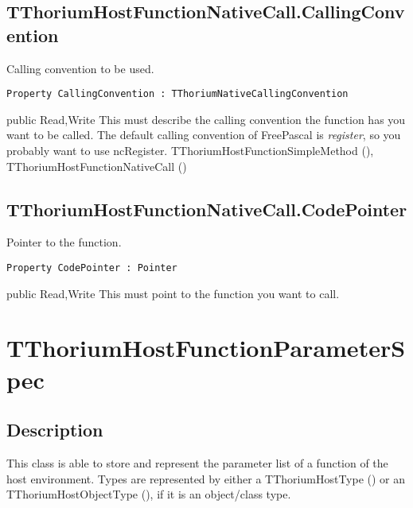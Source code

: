 \subsection{TThoriumHostFunctionNativeCall.CallingConvention}
\label{thoriumcorepkg:thorium:tthoriumhostfunctionnativecall:callingconvention}
\begin{FPCList}
\Synopsis
Calling convention to be used.\Declaration 

\begin{verbatim}
Property CallingConvention : TThoriumNativeCallingConvention
\end{verbatim}
\Visibility
public
\Access
Read,Write
\Description
This must describe the calling convention the function has you want to be called. The default calling convention of FreePascal is \textit{register}, so you probably want to use ncRegister.\SeeAlso
TThoriumHostFunctionSimpleMethod (\pageref{thoriumcorepkg:thorium:tthoriumhostfunctionsimplemethod}),
TThoriumHostFunctionNativeCall (\pageref{thoriumcorepkg:thorium:tthoriumhostfunctionnativecall})\end{FPCList}
\subsection{TThoriumHostFunctionNativeCall.CodePointer}
\label{thoriumcorepkg:thorium:tthoriumhostfunctionnativecall:codepointer}
\begin{FPCList}
\Synopsis
Pointer to the function.\Declaration 

\begin{verbatim}
Property CodePointer : Pointer
\end{verbatim}
\Visibility
public
\Access
Read,Write
\Description
This must point to the function you want to call.\end{FPCList}
\section{TThoriumHostFunctionParameterSpec}
\label{thoriumcorepkg:thorium:tthoriumhostfunctionparameterspec}
\subsection{Description}
This class is able to store and represent the parameter list of a function of the host environment. Types are represented by either a TThoriumHostType (\pageref{thoriumcorepkg:thorium}) or an TThoriumHostObjectType (\pageref{thoriumcorepkg:thorium:tthoriumhostobjecttype}), if it is an object/class type.%
